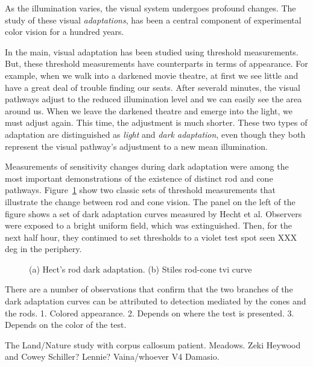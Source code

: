 
As the illumination varies,
the visual system undergoes profound changes.
The study of these visual {\em adaptations},
has been a central component
of experimental color vision for a hundred years.

In the main, visual adaptation has been studied using
threshold measurements.
But, these threshold measurements
have counterparts in terms of appearance.
For example, when we walk into a darkened movie theatre,
at first we see little and have a great deal of trouble
finding our seats.
After severald minutes, the visual pathways
adjust to the reduced illumination level and we can
easily see the area around us.
When we leave the darkened theatre and emerge into the light, 
we must adjust again.
This time, the adjustment is much shorter.
These two types of adaptation are distinguished
as {\em light} and {\em dark adaptation}, even though
they both represent the visual pathway's adjustment to a new
mean illumination.

Measurements of sensitivity changes during
dark adaptation were among the most important demonstrations
of the existence of distinct rod and cone pathways.
Figure~\ref{f8:rodcone} show two classic sets of
threshold measurements that illustrate the change
between rod and cone vision.
The panel on the left of the figure shows a set of dark
adaptation curves measured by Hecht et al.
Observers were exposed to a bright uniform field, which
was extinguished.
Then,  for the next half hour, they continued to set thresholds
to a violet test spot seen XXX deg in the periphery.

\begin{figure}
\centerline{
}
\caption[]{(a) Hect's rod dark adaptation.  (b)  Stiles rod-cone
tvi curve}
\label{f8:rodcone}
\end{figure}

There are a number of observations that
confirm that the two branches of the dark adaptation
curves can be attributed to
detection mediated by the cones and the rods.
1.  Colored appearance.
2.  Depends on where the test is presented.
3.  Depends on the color of the test.

The Land/Nature study with corpus callosum patient.
Meadows.
Zeki
Heywood and Cowey
Schiller?
Lennie?
Vaina/whoever V4 Damasio.
